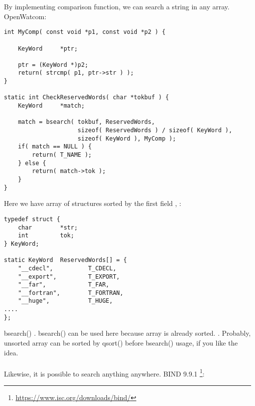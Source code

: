 {By implementing comparison function, we can search a string in any array}.
 OpenWatcom:

\begin{lstlisting}[caption=\textbackslash{}bld\textbackslash{}pbide\textbackslash{}defgen\textbackslash{}scan.c]
int MyComp( const void *p1, const void *p2 ) {

    KeyWord     *ptr;

    ptr = (KeyWord *)p2;
    return( strcmp( p1, ptr->str ) );
}

static int CheckReservedWords( char *tokbuf ) {
    KeyWord     *match;

    match = bsearch( tokbuf, ReservedWords,
                     sizeof( ReservedWords ) / sizeof( KeyWord ),
                     sizeof( KeyWord ), MyComp );
    if( match == NULL ) {
        return( T_NAME );
    } else {
        return( match->tok );
    }
}
\end{lstlisting}

{Here we have array of structures sorted by the first field} ,
:

\begin{lstlisting}[caption=\textbackslash{}bld\textbackslash{}pbide\textbackslash{}defgen\textbackslash{}scan.c]
typedef struct {
    char        *str;
    int         tok;
} KeyWord;

static KeyWord  ReservedWords[] = {
    "__cdecl",          T_CDECL,
    "__export",         T_EXPORT,
    "__far",            T_FAR,
    "__fortran",        T_FORTRAN,
    "__huge",           T_HUGE,
....
};
\end{lstlisting}

bsearch() .
{bsearch() can be used here because array is already sorted}.
.
{Probably, unsorted array can be sorted by qsort() before bsearch() usage, if you like the idea}. \\
\\
{Likewise, it is possible to search anything anywhere}.  BIND 9.9.1
\footnote{\url{https://www.isc.org/downloads/bind/}}:

